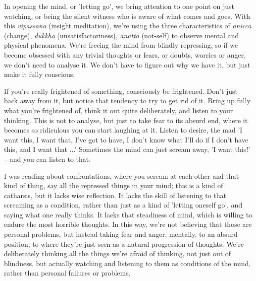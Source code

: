 
In opening the mind, or 'letting go', we bring attention to one point on just watching, or being the silent witness who is aware of what comes and goes. With this \textit{vipassana} (insight meditation), we're using the three characteristics of \textit{anicca} (change), \textit{dukkha} (unsatisfactoriness), \textit{anatta} (not-self) to observe mental and physical phenomena. We're freeing the mind from blindly repressing, so if we become obsessed with any trivial thoughts or fears, or doubts, worries or anger, we don't need to analyse it. We don't have to figure out why we have it, but just make it fully conscious.

If you're really frightened of something, consciously be frightened. Don't just back away from it, but notice that tendency to try to get rid of it. Bring up fully what you're frightened of, think it out quite deliberately, and listen to your thinking. This is not to analyse, but just to take fear to its absurd end, where it becomes so ridiculous you can start laughing at it. Listen to desire, the mad 'I want this, I want that, I've got to have, I don't know what I'll do if I don't have this, and I want that ...' Sometimes the mind can just scream away, 'I want this!' -- and you can listen to that.

I was reading about confrontations, where you scream at each other and that kind of thing, say all the repressed things in your mind; this is a kind of catharsis, but it lacks wise reflection. It lacks the skill of listening to that screaming as a condition, rather than just as a kind of 'letting oneself go', and saying what one really thinks. It lacks that steadiness of mind, which is willing to endure the most horrible thoughts. In this way, we're not believing that those are personal problems, but instead taking fear and anger, mentally, to an absurd position, to where they're just seen as a natural progression of thoughts. We're deliberately thinking all the things we're afraid of thinking, not just out of blindness, but actually watching and listening to them as conditions of the mind, rather than personal failures or problems.

